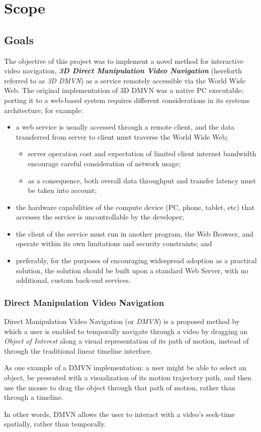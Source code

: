 
\chapter{Scope}

\section{Goals}
The objective of this project was to implement a novel method for interactive video navigation, \textbf{\emph{3D Direct Manipulation Video Navigation}} (hereforth referred to as \emph{3D DMVN}) as a service remotely accessible via the World Wide Web. The original implementation of 3D DMVN was a native PC executable; porting it to a web-based system requires different considerations in its systems architecture; for example:
\begin{itemize}
    \item a web service is usually accessed through a remote client, and the data transferred from server to client must traverse the World Wide Web;
    \begin{itemize}
        \item server operation cost and expectation of limited client internet bandwidth encourage careful consideration of network usage;
        \item as a consequence, both overall data throughput and transfer latency must be taken into account;
    \end{itemize}
    \item the hardware capabilities of the compute device (PC, phone, tablet, etc) that accesses the service is uncontrollable by the developer;
    \item the client of the service must run in another program, the Web Browser, and operate within its own limitations and security constraints; and
    \item preferably, for the purposes of encouraging widespread adoption as a practical solution, the solution should be built upon a standard Web Server, with no additional, custom back-end services.
\end{itemize}

\subsection{Direct Manipulation Video Navigation}
Direct Manipulation Video Navigation (or \emph{DMVN}) is a proposed method by which a user is enabled to temporally navigate through a video by dragging an \emph{Object of Interest} along a visual representation of its path of motion, instead of through the traditional linear timeline interface.\par
As one example of a DMVN implementation: a user might be able to select an object, be presented with a visualization of its motion trajectory path, and then use the mouse to drag the object through that path of motion, rather than through a timeline.\par
In other words, DMVN allows the user to interact with a video's seek-time spatially, rather than temporally.

